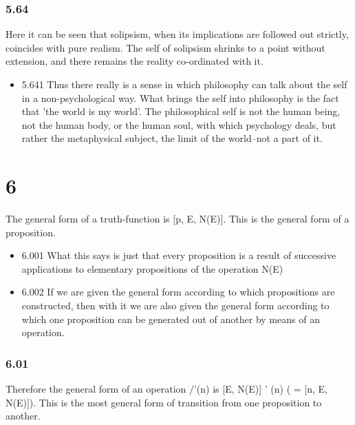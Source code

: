 \documentclass[11pt]{article}
\begin{document}
\subsubsection*{5.64}
\label{sec:orgdb66211}
Here it can be seen that solipsism, when its implications are followed
out strictly, coincides with pure realism. The self of solipsism shrinks to
a point without extension, and there remains the reality co-ordinated with
it.
\begin{itemize}
\item 5.641
\label{sec:orgb1451a5}
Thus there really is a sense in which philosophy can talk about the
self in a non-psychological way. What brings the self into philosophy is
the fact that 'the world is my world'. The philosophical self is not the
human being, not the human body, or the human soul, with which psychology
deals, but rather the metaphysical subject, the limit of the world--not a
part of it.
\end{itemize}
\section*{6}
\label{sec:orge701864}
The general form of a truth-function is [p, E, N(E)]. This is the general
form of a proposition.
\begin{itemize}
\item 6.001
\label{sec:orgf493e81}
What this says is just that every proposition is a result of
successive applications to elementary propositions of the operation N(E)
\item 6.002
\label{sec:orgdf919cc}
If we are given the general form according to which propositions are
constructed, then with it we are also given the general form according to
which one proposition can be generated out of another by means of an
operation.
\end{itemize}
\subsubsection*{6.01}
\label{sec:org9a2652b}
Therefore the general form of an operation /'(n) is [E, N(E)] ' (n) (
= [n, E, N(E)]). This is the most general form of transition from one
proposition to another.
\end{document}
